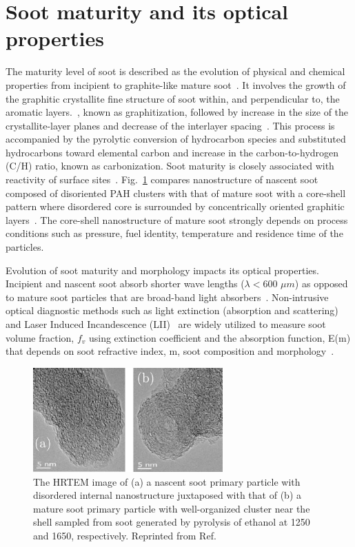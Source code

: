 \section{Soot maturity and its optical properties}
The maturity level of soot is described as the evolution of physical and chemical properties from incipient to graphite-like mature soot~\citep{michelsen2017probing}. It involves the growth of the graphitic crystallite fine structure of soot within,
and perpendicular to, the aromatic layers.~\citep{franklin1951crystallite, haynes1981soot}, known as graphitization, followed by increase in the size of
the crystallite-layer planes and decrease of the interlayer spacing~\citep{alfe2009structure}. This process is accompanied by the pyrolytic conversion of hydrocarbon species and substituted hydrocarbons toward elemental carbon and increase in the carbon-to-hydrogen (C/H) ratio, known as carbonization. Soot maturity is closely associated with reactivity of surface sites~\citep{camacho2015kinetics}. %
Fig.~\ref{fig:sootmaturity} compares nanostructure of nascent soot composed of disoriented PAH clusters with that of mature soot with a core-shell pattern where disordered core is surrounded by concentrically oriented graphitic layers~\citep{happold2009soot}. The core-shell nanostructure of mature soot strongly depends on process conditions such as pressure, fuel identity, temperature and residence time of the particles. 

Evolution of soot maturity and morphology impacts its optical properties. Incipient and nascent soot absorb shorter wave lengths ($\lambda<$600 $\mu m$) as opposed to mature soot particles that are broad-band light absorbers~\citep{hurt2000equilibrium}. Non-intrusive optical diagnostic methods such as light extinction (absorption and scattering)~\citep{mcenally1997soot} and Laser Induced Incandescence (LII)~\citep{shaddix1996laser} are widely utilized to measure soot volume fraction, $f_v$ using extinction coefficient and the absorption function, E(m) that depends on soot refractive index, m, soot composition and morphology~\citep{desgroux2013study}.

\begin{figure}[!htbp]
	\centering
	\includegraphics[height=40mm, ]{Figures/Introduction/soot_maturity.jpg}
	\caption{The HRTEM image of (a) a nascent soot primary particle with disordered internal nanostructure juxtaposed with that of (b) a mature soot primary particle with well-organized cluster near the shell sampled from soot generated by pyrolysis of ethanol at 1250 and 1650, respectively. Reprinted from Ref.\citep{vander2004soot}}
	\label{fig:sootmaturity}
\end{figure}



